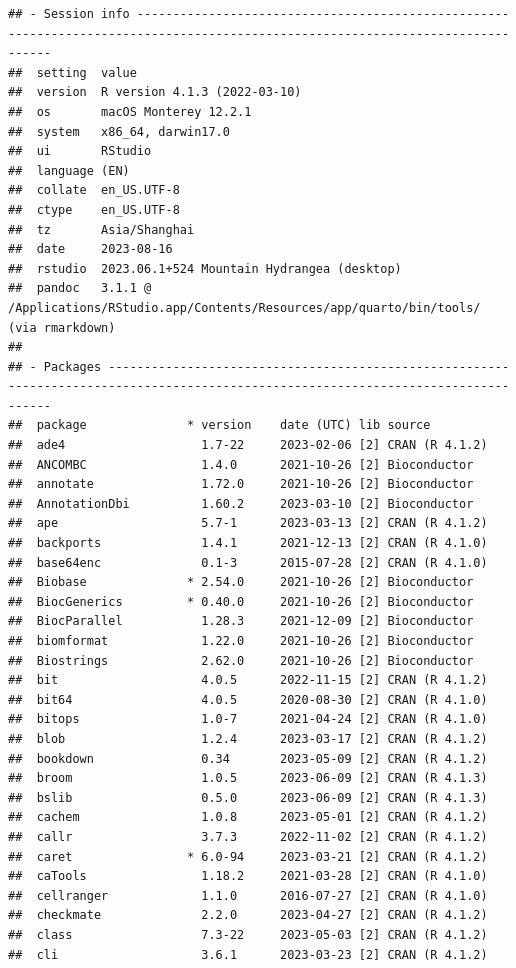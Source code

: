 \documentclass[
]{book}
\begin{document}
\begin{verbatim}
## - Session info --------------------------------------------------------------------------------------------------------------------------------
##  setting  value
##  version  R version 4.1.3 (2022-03-10)
##  os       macOS Monterey 12.2.1
##  system   x86_64, darwin17.0
##  ui       RStudio
##  language (EN)
##  collate  en_US.UTF-8
##  ctype    en_US.UTF-8
##  tz       Asia/Shanghai
##  date     2023-08-16
##  rstudio  2023.06.1+524 Mountain Hydrangea (desktop)
##  pandoc   3.1.1 @ /Applications/RStudio.app/Contents/Resources/app/quarto/bin/tools/ (via rmarkdown)
## 
## - Packages ------------------------------------------------------------------------------------------------------------------------------------
##  package              * version    date (UTC) lib source
##  ade4                   1.7-22     2023-02-06 [2] CRAN (R 4.1.2)
##  ANCOMBC                1.4.0      2021-10-26 [2] Bioconductor
##  annotate               1.72.0     2021-10-26 [2] Bioconductor
##  AnnotationDbi          1.60.2     2023-03-10 [2] Bioconductor
##  ape                    5.7-1      2023-03-13 [2] CRAN (R 4.1.2)
##  backports              1.4.1      2021-12-13 [2] CRAN (R 4.1.0)
##  base64enc              0.1-3      2015-07-28 [2] CRAN (R 4.1.0)
##  Biobase              * 2.54.0     2021-10-26 [2] Bioconductor
##  BiocGenerics         * 0.40.0     2021-10-26 [2] Bioconductor
##  BiocParallel           1.28.3     2021-12-09 [2] Bioconductor
##  biomformat             1.22.0     2021-10-26 [2] Bioconductor
##  Biostrings             2.62.0     2021-10-26 [2] Bioconductor
##  bit                    4.0.5      2022-11-15 [2] CRAN (R 4.1.2)
##  bit64                  4.0.5      2020-08-30 [2] CRAN (R 4.1.0)
##  bitops                 1.0-7      2021-04-24 [2] CRAN (R 4.1.0)
##  blob                   1.2.4      2023-03-17 [2] CRAN (R 4.1.2)
##  bookdown               0.34       2023-05-09 [2] CRAN (R 4.1.2)
##  broom                  1.0.5      2023-06-09 [2] CRAN (R 4.1.3)
##  bslib                  0.5.0      2023-06-09 [2] CRAN (R 4.1.3)
##  cachem                 1.0.8      2023-05-01 [2] CRAN (R 4.1.2)
##  callr                  3.7.3      2022-11-02 [2] CRAN (R 4.1.2)
##  caret                * 6.0-94     2023-03-21 [2] CRAN (R 4.1.2)
##  caTools                1.18.2     2021-03-28 [2] CRAN (R 4.1.0)
##  cellranger             1.1.0      2016-07-27 [2] CRAN (R 4.1.0)
##  checkmate              2.2.0      2023-04-27 [2] CRAN (R 4.1.2)
##  class                  7.3-22     2023-05-03 [2] CRAN (R 4.1.2)
##  cli                    3.6.1      2023-03-23 [2] CRAN (R 4.1.2)

\end{verbatim}
\end{document}
